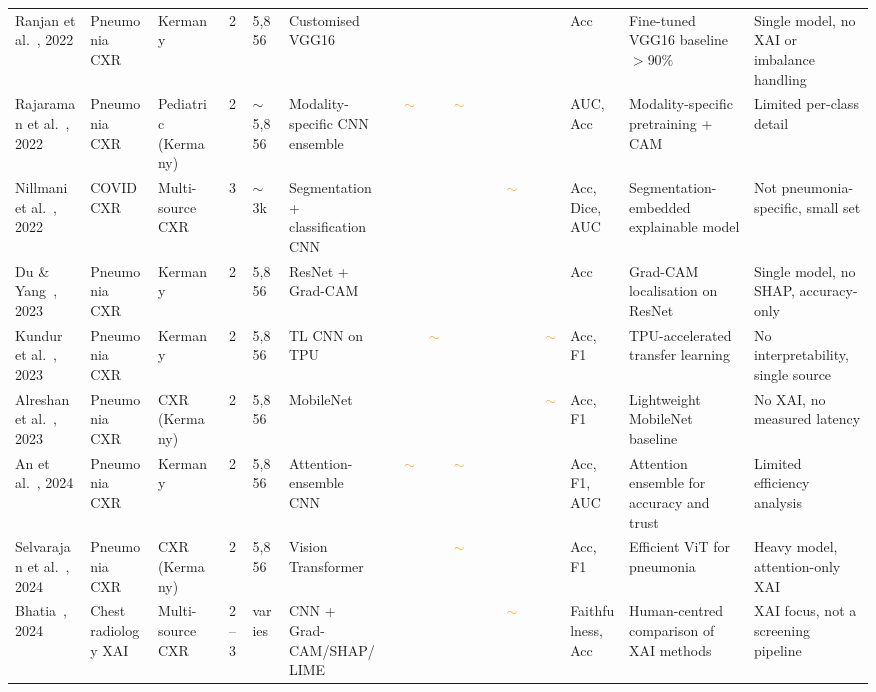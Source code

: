 \documentclass[preprint,12pt]{elsarticle}
\newcommand{\cmark}{\ding{51}} %
\newcommand{\xmark}{\ding{55}} %
\newcommand{\pmark}{\textcolor{orange}{$\sim$}} %
\begin{document}
\begin{table}
\begin{adjustbox}{max width=\textwidth}
\begin{tabular}{p{1.5cm} p{1.7cm} p{1.4cm} c p{1.0cm} p{1.9cm} c c c c c c c c c p{1.7cm} p{2.4cm} p{2.4cm}}
Ranjan et al.~\cite{ranjan2022transfer}, 2022 & Pneumonia CXR & Kermany & 2 & 5{,}856 & Customised VGG16 & \cmark & \xmark & \xmark & \xmark & \xmark & \xmark & \xmark & \xmark & \xmark & Acc & Fine-tuned VGG16 baseline $>$90\% & Single model, no XAI or imbalance handling \\
Rajaraman et al.~\cite{rajaraman2022modality}, 2022 & Pneumonia CXR & Pediatric (Kermany) & 2 & $\sim$5{,}856 & Modality-specific CNN ensemble & \cmark & \pmark & \cmark & \pmark & \xmark & \xmark & \xmark & \xmark & \xmark & AUC, Acc & Modality-specific pretraining + CAM & Limited per-class detail \\
Nillmani et al.~\cite{nillmani2022segmentation}, 2022 & COVID CXR & Multi-source CXR & 3 & $\sim$3k & Segmentation + classification CNN & \cmark & \xmark & \cmark & \cmark & \xmark & \xmark & \pmark & \xmark & \xmark & Acc, Dice, AUC & Segmentation-embedded explainable model & Not pneumonia-specific, small set \\
Du \& Yang~\cite{du2023classification}, 2023 & Pneumonia CXR & Kermany & 2 & 5{,}856 & ResNet + Grad-CAM & \cmark & \xmark & \xmark & \cmark & \xmark & \xmark & \xmark & \xmark & \xmark & Acc & Grad-CAM localisation on ResNet & Single model, no SHAP, accuracy-only \\
Kundur et al.~\cite{kundur2023pneumonia}, 2023 & Pneumonia CXR & Kermany & 2 & 5{,}856 & TL CNN on TPU & \cmark & \xmark & \pmark & \xmark & \xmark & \xmark & \xmark & \xmark & \pmark & Acc, F1 & TPU-accelerated transfer learning & No interpretability, single source \\
Alreshan et al.~\cite{alreshan2023mobilenet}, 2023 & Pneumonia CXR & CXR (Kermany) & 2 & 5{,}856 & MobileNet & \cmark & \xmark & \xmark & \xmark & \xmark & \xmark & \xmark & \xmark & \pmark & Acc, F1 & Lightweight MobileNet baseline & No XAI, no measured latency \\
An et al.~\cite{an2024attention}, 2024 & Pneumonia CXR & Kermany & 2 & 5{,}856 & Attention-ensemble CNN & \cmark & \pmark & \cmark & \pmark & \xmark & \xmark & \xmark & \xmark & \xmark & Acc, F1, AUC & Attention ensemble for accuracy and trust & Limited efficiency analysis \\
Selvarajan et al.~\cite{selvarajan2024efficient}, 2024 & Pneumonia CXR & CXR (Kermany) & 2 & 5{,}856 & Vision Transformer & \cmark & \xmark & \xmark & \pmark & \xmark & \xmark & \xmark & \xmark & \xmark & Acc, F1 & Efficient ViT for pneumonia & Heavy model, attention-only XAI \\
Bhatia~\cite{bhatia2024evaluating}, 2024 & Chest radiology XAI & Multi-source CXR & 2--3 & varies & CNN + Grad-CAM/SHAP/LIME & \cmark & \xmark & \cmark & \cmark & \cmark & \xmark & \pmark & \xmark & \xmark & Faithfulness, Acc & Human-centred comparison of XAI methods & XAI focus, not a screening pipeline \\

\end{tabular}
\end{adjustbox}
\end{table}
\end{document}
